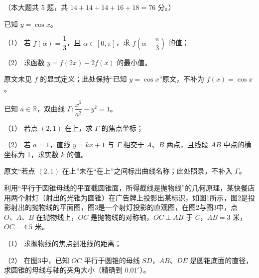 （本大题共 5 题，共 $14+14+14+16+18=76$ 分。）

\begin{question}
已知 $y=\cos x$。

（1） 若 $f(\alpha)=\dfrac13$，且 $\alpha\in[0,\pi]$，求 $f\left(\alpha-\dfrac\pi3\right)$ 的值；

（2） 求函数 $y=f(2x)-2f(x)$ 的最小值。

\begin{gktip}
原文未见 $f$ 的显式定义；此处保持“已知 $y=\cos x$”原文，不补为 $f(x)=\cos x$。
\end{gktip}

\end{question}
\begin{question}
已知 $a\in\mathbb R$，双曲线 $\Gamma:\dfrac{x^2}{a^2}-y^2=1$。

（1） 若点 $(2,1)$ 在上，求 $\Gamma$ 的焦点坐标；

（2） 若 $a=1$，直线 $y=kx+1$ 与 $\Gamma$ 相交于 $A\text{、}B$ 两点，且线段 $AB$ 中点的横坐标为 1，求实数 $k$ 的值。

\begin{gktip}
原文“若点 $(2,1)$ 在上”未在“在上”之间标出曲线名称；此处照录，不补入 $\Gamma$。
\end{gktip}

\Needspace{0.4\textheight}
\end{question}
\begin{question}
利用“平行于圆锥母线的平面截圆锥面，所得截线是抛物线”的几何原理，某快餐店用两个射灯（射出的光锥为圆锥）在广告牌上投影出某标识，如图1所示，图2是投影射出的抛物线的平面图，图3是一个射灯投影的直观图，在图2与图3中，点 $O\text{、}A\text{、}B$ 在抛物线上，$OC$ 是抛物线的对称轴，$OC\perp AB$ 于 $C$，$AB=3$ 米，$OC=4.5$ 米。

（1） 求抛物线的焦点到准线的距离；

（2） 在图3中，已知 $OC$ 平行于圆锥的母线 $SD$，$AB\text{、}DE$ 是圆锥底面的直径，求圆锥的母线与轴的夹角大小（精确到 $0.01^\circ$）。
\nopagebreak[4]
\begin{center}\end{center}
\nopagebreak[4]
\nopagebreak[4]
\begin{center}\end{center}
\nopagebreak[4]
\nopagebreak[4]
\begin{center}\end{center}
\nopagebreak[4]
\end{question}
